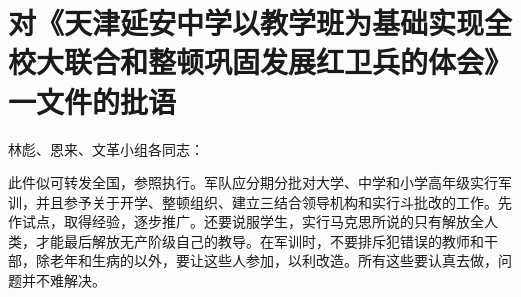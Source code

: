 \section[对《天津延安中学以教学班为基础实现全校大联合和整顿巩固发展红卫兵的体会》一文件的批语（一九六七年三月七日）]{对《天津延安中学以教学班为基础实现全校大联合和整顿巩固发展红卫兵的体会》一文件的批语}


林彪、恩来、文革小组各同志：

此件似可转发全国，参照执行。军队应分期分批对大学、中学和小学高年级实行军训，并且参予关于开学、整顿组织、建立三结合领导机构和实行斗批改的工作。先作试点，取得经验，逐步推广。还要说服学生，实行马克思所说的只有解放全人类，才能最后解放无产阶级自己的教导。在军训时，不要排斥犯错误的教师和干部，除老年和生病的以外，要让这些人参加，以利改造。所有这些要认真去做，问题并不难解决。


